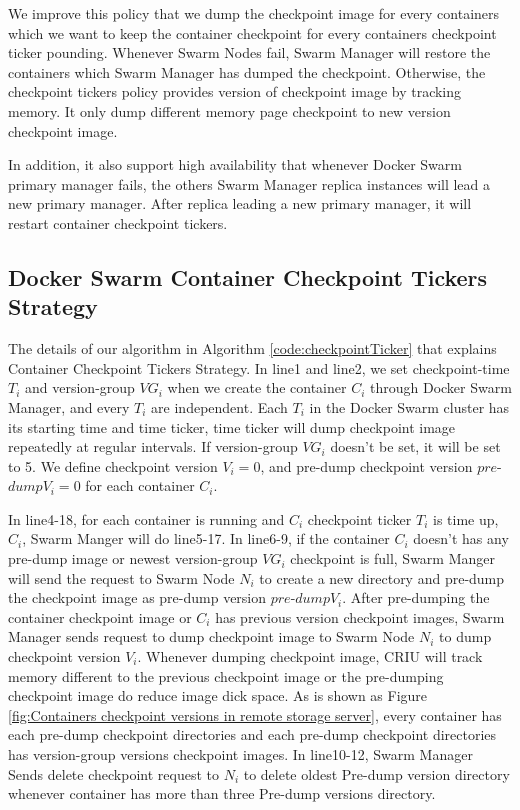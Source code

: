We improve this policy that we dump the checkpoint image for every containers which we want to keep the container checkpoint for every containers checkpoint ticker pounding. Whenever Swarm Nodes fail, Swarm Manager will restore the containers which Swarm Manager has dumped the checkpoint. Otherwise, the checkpoint tickers policy provides version of checkpoint image by tracking memory. It only dump different memory page checkpoint to new version checkpoint image.

In addition, it also support high availability that whenever Docker Swarm primary manager fails, the others Swarm Manager replica instances will lead a new primary manager. After replica leading a new primary manager, it will restart container checkpoint tickers.

\subsection{Docker Swarm Container Checkpoint Tickers Strategy}
The details of our algorithm in Algorithm \ref{code:checkpointTicker} that explains Container Checkpoint Tickers Strategy.
In line1 and line2, we set checkpoint-time $T_i$ and version-group $VG_i$ when we create the container $C_i$ through Docker Swarm Manager, and every $T_i$ are independent.
Each $T_i$ in the Docker Swarm cluster has its starting time and time ticker, time ticker will dump checkpoint image repeatedly at regular intervals. If version-group $VG_i$ doesn't be set, it will be set to 5.
We define checkpoint version $V_i=0$, and pre-dump checkpoint version $pre$-$dump V_i=0$ for each container $C_i$.

In line4-18, for each container is running and $C_i$ checkpoint ticker $T_i$ is time up, $C_i$, Swarm Manger will do line5-17.
In line6-9, if the container $C_i$ doesn't has any pre-dump image or newest version-group $VG_i$ checkpoint is full, Swarm Manger will send the request to Swarm Node $N_i$ to create a new directory and pre-dump the checkpoint image as pre-dump version $pre$-$dump V_i$.
After pre-dumping the container checkpoint image or $C_i$ has previous version checkpoint images, Swarm Manager sends request to dump checkpoint image to Swarm Node $N_i$ to dump checkpoint version $V_i$. Whenever dumping checkpoint image, CRIU will track memory different to the previous checkpoint image or the pre-dumping checkpoint image do reduce image dick space. As is shown as Figure \ref{fig:Containers checkpoint versions in remote storage server}, every container has each pre-dump checkpoint directories and each pre-dump checkpoint directories has version-group versions checkpoint images.
In line10-12, Swarm Manager Sends delete checkpoint request to $N_i$ to delete oldest Pre-dump version directory whenever container has more than three Pre-dump versions directory. 


